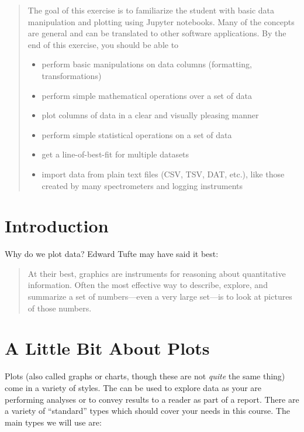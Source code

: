 \maketitle

\begin{abstract}
	\noindent
	The goal of this exercise is to familiarize the student with basic data manipulation and plotting using Jupyter notebooks.
	Many of the concepts are general and can be translated to other software applications.
	By the end of this exercise, you should be able to
	\begin{itemize}
		\item perform basic manipulations on data columns (formatting, transformations)
		\item perform simple mathematical operations over a set of data
		\item plot columns of data in a clear and visually pleasing manner
		\item perform simple statistical operations on a set of data
		\item get a line-of-best-fit for multiple datasets
		\item import data from plain text files (CSV, TSV, DAT, etc.), like those created by many spectrometers and logging instruments
	\end{itemize}
\end{abstract}

\section{Introduction} %
\label{sec:intro}

Why do we plot data? Edward Tufte may have said it best:

\begin{quote}
	At their best, graphics are instruments for reasoning about quantitative information.
	Often the most effective way to describe, explore, and summarize a set of numbers---even a very large set---is to look at pictures of those numbers.
\end{quote}

\section{A Little Bit About Plots} %
\label{sec:a-little-bit-about-plots}

Plots (also called graphs or charts, though these are not \emph{quite} the same thing) come in a variety of styles.
The can be used to explore data as your are performing analyses or to convey results to a reader as part of a report.
There are a variety of ``standard'' types which should cover your needs in this course.
The main types we will use are:

